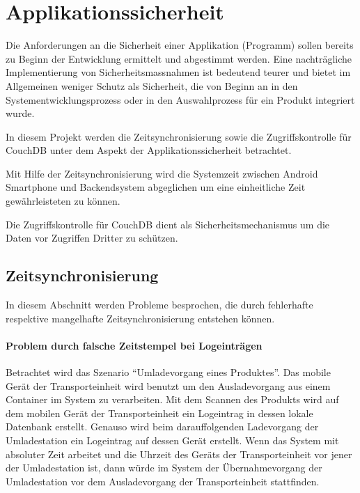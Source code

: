 \section{Applikationssicherheit}
\label{sec:security}

Die Anforderungen an die Sicherheit einer Applikation (Programm) sollen bereits
	zu Beginn der Entwicklung ermittelt und abgestimmt werden. Eine nachträgliche
	Implementierung von Sicherheitsmassnahmen ist bedeutend teurer und bietet im
	Allgemeinen weniger Schutz als Sicherheit, die von Beginn an in den
	Systementwicklungsprozess oder in den Auswahlprozess für ein Produkt
	integriert wurde.
	
In diesem Projekt werden die Zeitsynchronisierung sowie die Zugriffskontrolle für
	CouchDB unter dem Aspekt der Applikationssicherheit betrachtet.
	
Mit Hilfe der Zeitsynchronisierung wird die Systemzeit zwischen Android Smartphone
	und Backendsystem abgeglichen um eine einheitliche Zeit gewährleisteten zu können.

Die Zugriffskontrolle für CouchDB dient als Sicherheitsmechanismus um die Daten vor
	Zugriffen Dritter zu schützen.

\subsection{Zeitsynchronisierung}
\label{subsec:timesync}

In diesem Abschnitt werden Probleme besprochen, die durch fehlerhafte respektive
	mangelhafte Zeitsynchronisierung entstehen können.

\paragraph{Problem durch falsche Zeitstempel bei Logeinträgen} Betrachtet wird das
	Szenario ``Umladevorgang eines Produktes''. Das mobile Gerät der Transporteinheit
	wird benutzt um den Ausladevorgang aus einem Container im System zu verarbeiten.
	Mit dem Scannen des Produkts wird auf dem mobilen Gerät der Transporteinheit ein
	Logeintrag in dessen lokale Datenbank erstellt. Genauso wird beim darauffolgenden 
	Ladevorgang der Umladestation ein Logeintrag auf dessen Gerät erstellt. Wenn das
	System mit absoluter Zeit arbeitet und die Uhrzeit des Geräts der Transporteinheit
	vor jener der Umladestation ist, dann würde im System der Übernahmevorgang der
	Umladestation vor dem Ausladevorgang der Transporteinheit stattfinden.


